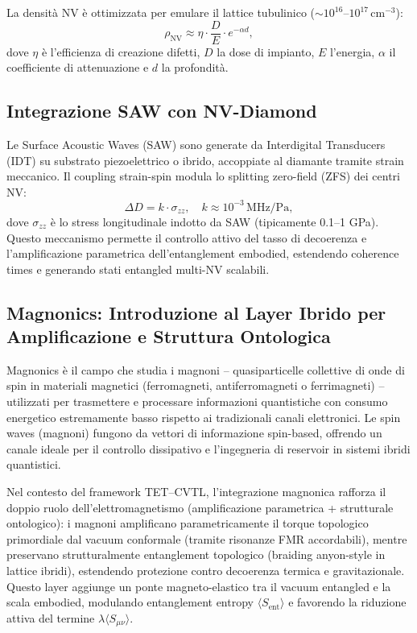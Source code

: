 \documentclass[12pt,a4paper]{article}
\begin{document}
La densità NV è ottimizzata per emulare il lattice tubulinico ($\sim 10^{16}$--$10^{17}\,\mathrm{cm}^{-3}$):
\begin{equation}
\rho_{\mathrm{NV}} \approx \eta \cdot \frac{D}{E} \cdot e^{-\alpha d},
\label{eq:NV_density}
\end{equation}
dove $\eta$ è l'efficienza di creazione difetti, $D$ la dose di impianto, $E$ l'energia, $\alpha$ il coefficiente di attenuazione e $d$ la profondità.

\subsection{Integrazione SAW con NV-Diamond}

Le Surface Acoustic Waves (SAW) sono generate da Interdigital Transducers (IDT) su substrato piezoelettrico o ibrido, accoppiate al diamante tramite strain meccanico. Il coupling strain-spin modula lo splitting zero-field (ZFS) dei centri NV:
\begin{equation}
\Delta D = k \cdot \sigma_{zz}, \quad k \approx 10^{-3}\,\mathrm{MHz}/\mathrm{Pa},
\label{eq:SAW_ZFS}
\end{equation}
dove $\sigma_{zz}$ è lo stress longitudinale indotto da SAW (tipicamente 0.1--1 GPa). Questo meccanismo permette il controllo attivo del tasso di decoerenza e l'amplificazione parametrica dell'entanglement embodied, estendendo coherence times e generando stati entangled multi-NV scalabili.

\subsection{Magnonics: Introduzione al Layer Ibrido per Amplificazione e Struttura Ontologica }

Magnonics è il campo che studia i magnoni – quasiparticelle collettive di onde di spin in materiali magnetici (ferromagneti, antiferromagneti o ferrimagneti) – utilizzati per trasmettere e processare informazioni quantistiche con consumo energetico estremamente basso rispetto ai tradizionali canali elettronici. Le spin waves (magnoni) fungono da vettori di informazione spin-based, offrendo un canale ideale per il controllo dissipativo e l'ingegneria di reservoir in sistemi ibridi quantistici.

Nel contesto del framework TET--CVTL, l'integrazione magnonica rafforza il doppio ruolo dell'elettromagnetismo (amplificazione parametrica + strutturale ontologico): i magnoni amplificano parametricamente il torque topologico primordiale dal vacuum conformale (tramite risonanze FMR accordabili), mentre preservano strutturalmente entanglement topologico (braiding anyon-style in lattice ibridi), estendendo protezione contro decoerenza termica e gravitazionale. Questo layer aggiunge un ponte magneto-elastico tra il vacuum entangled e la scala embodied, modulando entanglement entropy $\langle S_{\mathrm{ent}} \rangle$ e favorendo la riduzione attiva del termine $\lambda \langle S_{\mu\nu} \rangle$.
\end{document}
